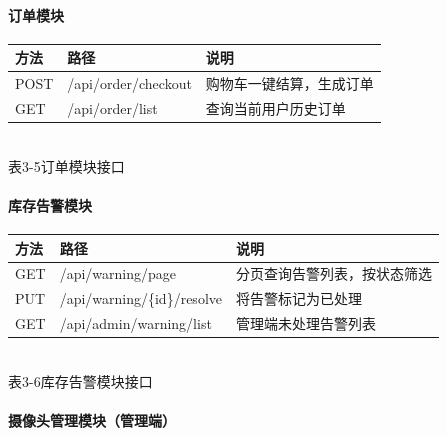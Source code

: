 \paragraph{订单模块}

\begin{center}
  \renewcommand{\arraystretch}{1.4}
  \begin{tabular}{|>{\centering\arraybackslash}m{1.5cm}|>{\centering\arraybackslash}m{5.2cm}|>{\centering\arraybackslash}m{6.0cm}|}
    \hline
    \textbf{方法} & \textbf{路径}         & \textbf{说明}  \\ \hline
    POST        & /api/order/checkout & 购物车一键结算，生成订单 \\ \hline
    GET         & /api/order/list     & 查询当前用户历史订单   \\ \hline
  \end{tabular}
  \\[0.3em]
  {表3-5\quad 订单模块接口}
\end{center}

\paragraph{库存告警模块}

\begin{center}
  \renewcommand{\arraystretch}{1.4}
  \begin{tabular}{|>{\centering\arraybackslash}m{1.5cm}|>{\centering\arraybackslash}m{5.2cm}|>{\centering\arraybackslash}m{6.0cm}|}
    \hline
    \textbf{方法} & \textbf{路径}                 & \textbf{说明}    \\ \hline
    GET         & /api/warning/page           & 分页查询告警列表，按状态筛选 \\ \hline
    PUT         & /api/warning/\{id\}/resolve & 将告警标记为已处理      \\ \hline
    GET         & /api/admin/warning/list     & 管理端未处理告警列表     \\ \hline
  \end{tabular}
  \\[0.3em]
  {表3-6\quad 库存告警模块接口}
\end{center}

\paragraph{摄像头管理模块（管理端）}

